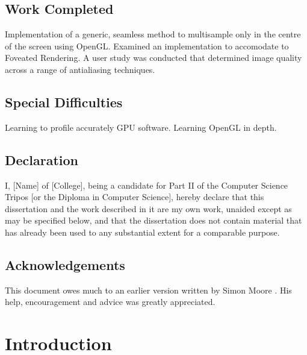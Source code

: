 \documentclass[12pt,a4paper,twoside,openright]{report}
\begin{document}
\section*{Work Completed}

Implementation of a generic, seamless method to multisample only in the centre of the screen using OpenGL. Examined an implementation to accomodate to Foveated Rendering.
A user study was conducted that determined image quality across a range of antialiasing techniques.

\section*{Special Difficulties}

Learning to profile accurately GPU software.
Learning OpenGL in depth.
 
\newpage
\section*{Declaration}

I, [Name] of [College], being a candidate for Part II of the Computer
Science Tripos [or the Diploma in Computer Science], hereby declare
that this dissertation and the work described in it are my own work,
unaided except as may be specified below, and that the dissertation
does not contain material that has already been used to any substantial
extent for a comparable purpose.

\bigskip
{}

\medskip
{}

\tableofcontents

\listoffigures

\newpage
\section*{Acknowledgements}

This document owes much to an earlier version written by Simon Moore
\cite{Moore95}.  His help, encouragement and advice was greatly 
appreciated.


\pagestyle{headings}

\chapter{Introduction}
\end{document}
